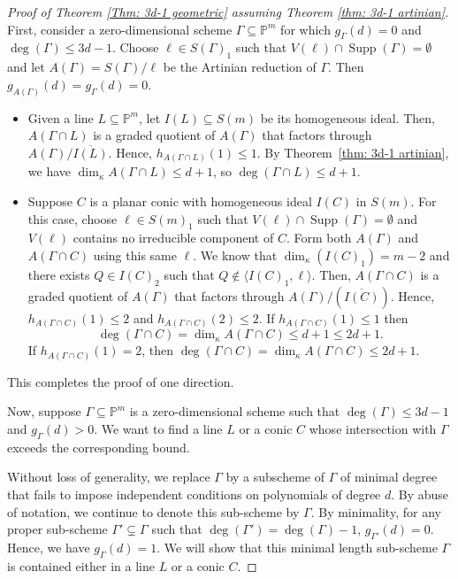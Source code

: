 \documentclass[11pt]{amsart}
\theoremstyle{definition}
\newcommand{\PP}{\mathbb{P}}
\newcommand{\sg}{S(\Gamma)}
\newcommand{\ag}{A(\Gamma)}
\newcommand{\Supp}{\operatorname{Supp}}
\newcommand{\dimk}{\dim_{\kappa}}
\newcommand{\Pm}{\mathbb{P}^m}
\begin{document}
\begin{proof}[Proof of Theorem \ref{Thm: 3d-1 geometric} assuming Theorem \ref{thm: 3d-1 artinian}]

First, consider a zero-dimensional scheme $\Gamma \subseteq \PP^m$ for which $g_\Gamma(d)=0$ and $\deg(\Gamma) \leq 3d-1$. Choose $\ell \in \sg_1$ such that $V(\ell) \cap \Supp(\Gamma)=\emptyset$ and let $\ag=\sg/\ell$ be the Artinian reduction of $\Gamma$. Then $g_{\ag}(d)=g_\Gamma(d)=0$. 

\begin{itemize}
    \item Given a line $L\subseteq \Pm$, let $I(L)\subseteq S(m)$ be its homogeneous ideal. Then, $A(\Gamma \cap L)$ is a graded quotient of $\ag$ that factors through $\ag/\overline{I(L)}$. Hence, $h_{A(\Gamma \cap L)}(1) \leq 1$. 
    By Theorem~\ref{thm: 3d-1 artinian}, we have $\dimk A(\Gamma \cap L)\leq d+1$, so $\deg(\Gamma \cap L) \leq d+1$.
    \item Suppose $C$ is a planar conic with homogeneous ideal $I(C)$ in $S(m)$.
    For this case, choose $\ell\in S(m)_1$ such that $V(\ell)\cap \Supp(\Gamma)=\emptyset$ and $V(\ell)$ contains no irreducible component of $C$.
    Form both $A(\Gamma)$ and $A(\Gamma\cap C)$ using this same $\ell$.
    We know that $\dimk(I(C)_1)=m-2$ and there exists $Q \in I(C)_2$ such that $Q\notin \langle I(C)_1, \ell\rangle$. Then, $A(\Gamma \cap C)$ is a graded quotient of $\ag$ that factors through $\ag/(\overline{I(C)})$. Hence, $h_{A(\Gamma \cap C)}(1) \leq 2$ and $h_{A(\Gamma \cap C)}(2) \leq 2$. 
    If $h_{A(\Gamma \cap C)}(1) \leq 1$ then 
    \[
    \deg(\Gamma \cap C) =\dimk A(\Gamma\cap C) \leq d+1 \leq 2d+1.
    \] 
    If $h_{A(\Gamma \cap C)}(1) =2$, then $\deg(\Gamma \cap C) = \dimk A(\Gamma\cap C) \leq 2d+1$.
\end{itemize}
This completes the proof of one direction.



Now, suppose $\Gamma \subseteq \PP^m$ is a zero-dimensional scheme such that $\deg(\Gamma)\leq 3d-1$ and $g_\Gamma(d)>0$. 
We want to find a line $L$ or a conic $C$ whose intersection with $\Gamma$ exceeds the corresponding bound.

Without loss of generality, we replace $\Gamma$ by a subscheme of $\Gamma$ of minimal degree that fails to impose independent conditions on polynomials of degree $d$.
By abuse of notation, we continue to denote this sub-scheme by $\Gamma$. By minimality, for any proper sub-scheme $\Gamma' \subsetneq \Gamma$ such that $\deg(\Gamma')=\deg(\Gamma)-1$, $g_{\Gamma'}(d)=0$. Hence, we have $g_\Gamma (d)=1$. We will show that this minimal length sub-scheme $\Gamma$ is contained either in a line $L$ or a conic $C$.


\end{proof}
\end{document}
